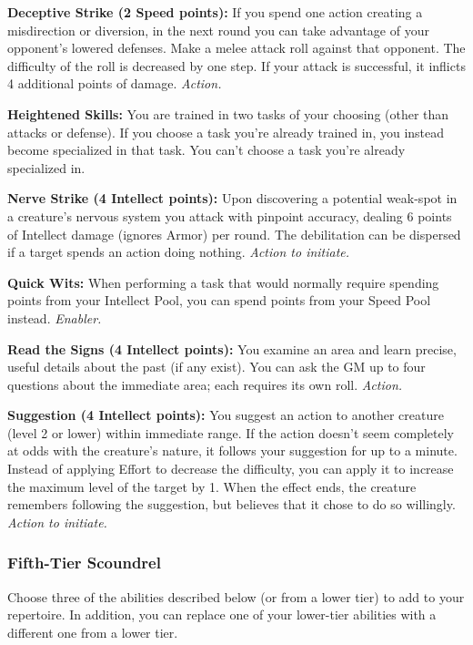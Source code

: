 \documentclass[a4paper,10pt,final,twocolumn,oneside]{book}
\newcommand{\itemAbility}[2]{\textcolor{25gray}{\textbullet\textbf{ #1:}}{ #2}\par}
\newcommand{\enabler}{\textit{ Enabler.}}
\newcommand{\action}{\textit{ Action.}}
\newcommand{\actionInit}{\textit{ Action to initiate.}}
\begin{document}
\itemAbility{Deceptive Strike (2 Speed points)}{If you spend one action creating a misdirection or diversion, in the next round you can take advantage of your opponent’s lowered defenses. Make a melee attack roll against that opponent. The difficulty of the roll is decreased by one step. If your attack is successful, it inflicts 4 additional points of damage.\action}

\itemAbility{Heightened Skills}{You are trained in two tasks of your choosing (other than attacks or defense). If you choose a task you’re already trained in, you instead become specialized in that task. You can’t choose a task you’re already specialized in.}

\itemAbility{Nerve Strike (4 Intellect points)}{Upon discovering a potential weak-spot in a creature's nervous system you attack with pinpoint accuracy, dealing 6 points of Intellect damage (ignores Armor) per round. The debilitation can be dispersed if a target spends an action doing nothing.\actionInit}

\itemAbility{Quick Wits}{When performing a task that would normally require spending points from your Intellect Pool, you can spend points from your Speed Pool instead.\enabler}

\itemAbility{Read the Signs (4 Intellect points)}{You examine an area and learn precise, useful details about the past (if any exist). You can ask the GM up to four questions about the immediate area; each requires its own roll. \action}

\itemAbility{Suggestion (4 Intellect points)}{You suggest an action to another creature (level 2 or lower) within immediate range. If the action doesn’t seem completely at odds with the creature’s nature, it follows your suggestion for up to a minute. Instead of applying Effort to decrease the difficulty, you can apply it to increase the maximum level of the target by 1. When the effect ends, the creature remembers following the suggestion, but believes that it chose to do so willingly. \actionInit}


\subsubsection*{Fifth-Tier Scoundrel}
\label{subsub:scoundrelFifthTier}

Choose three of the abilities described below (or from a lower tier) to add to your repertoire. In addition, you can replace one of your lower-tier abilities with a different one from a lower tier.
\end{document}
